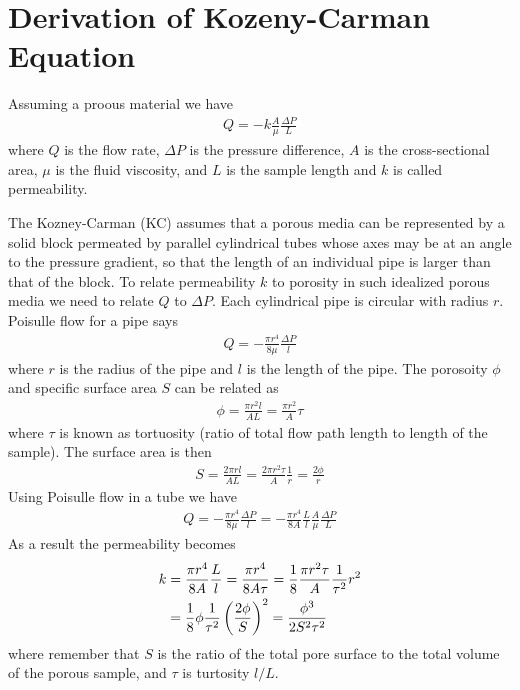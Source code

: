 \section{Derivation of Kozeny-Carman Equation}
%
Assuming a proous material we have
%
\begin{align}
    Q = -k \frac{A}{\mu} \frac{\Delta P}{L}
\end{align}
%
where $Q$ is the flow rate, $\Delta P$ is the pressure difference, $A$ is the cross-sectional area, $\mu$ is the fluid viscosity, and $L$ is the sample length and $k$ is called permeability.


The Kozney-Carman (KC) assumes that a porous media can be represented by a solid block permeated by parallel cylindrical tubes whose axes may be at an angle to the pressure gradient, so that the length of an individual pipe is larger than that of the block. To relate permeability $k$ to porosity in such idealized porous media we need to relate $Q$ to $\Delta P$. Each cylindrical pipe is circular with radius $r$. Poisulle flow for a pipe says 
%
\begin{align}
    Q = - \frac{\pi r^4}{8\mu} \frac{\Delta P}{l}
\end{align}
%
where $r$ is the radius of the pipe and $l$ is the length of the pipe. The porosoity $\phi$ and specific surface area $S$ can be related as 
%
\begin{align}
    \phi = \frac{\pi r^2 l}{A L}  = \frac{\pi r^2}{A } \tau
\end{align}
%
where $\tau$ is known as tortuosity (ratio of total flow path length to length of the sample). 
%
The surface area is then
%
\begin{align}
    S = \frac{2\pi r l}{A L} = \frac{2 \pi r^2 \tau}{A} \frac{1}{r} = \frac{2\phi}{r}
\end{align}
%
Using Poisulle flow in a tube we have
%
\begin{align}
    Q = - \frac{\pi r^4}{8\mu} \frac{\Delta P}{l} = - \frac{\pi r^4}{8A}\frac{L}{l} \frac{A}{\mu} \frac{\Delta P}{L} 
\end{align}
%
As a result the permeability becomes 
%
\begin{align}
    k & = \frac{\pi r^4}{8A} \frac{L}{l} = \frac{\pi r^4}{8A\tau} = \frac{1}{8} \frac{\pi r^2\tau}{A} \frac{1}{\tau^2}r^2 \\
    & = \frac{1}{8} \phi \frac{1}{\tau^2} \left( \frac{2\phi}{S}\right)^2 = \frac{\phi^3}{2S^2 \tau^2}
\end{align}
%
where remember that $S$ is the ratio of the total pore surface to the total volume of the porous sample, and $\tau$ is turtosity $l/L$.  



